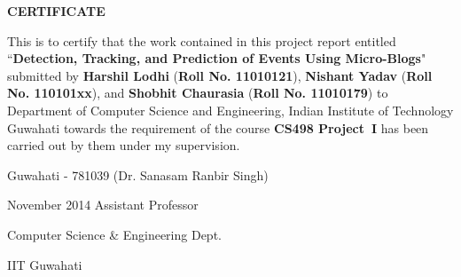 \documentclass[12pt,a4paper]{report}
\begin{document}

 \setcounter{page}{2}
\begin{center}
{\Large{\bf{CERTIFICATE}}}
\end{center}

\noindent
This is to certify that the work contained in this project report
entitled ``{\bf Detection, Tracking, and Prediction of Events Using Micro-Blogs}" submitted
by {\bf Harshil Lodhi} (\small{{\bf Roll No. 11010121})}, {\bf Nishant Yadav} (\small{{\bf Roll No. 110101xx})}, 
and {\bf Shobhit Chaurasia} (\small{{\bf Roll No. 11010179})} to Department of Computer Science and Engineering, 
Indian Institute of Technology Guwahati
towards the requirement of the course \textbf{CS498 Project~I}
has been carried out by them under my
supervision.

\vspace{4cm}

\noindent Guwahati - 781039 \hfill (Dr. Sanasam Ranbir Singh)

\noindent November 2014 \hfill \small{Assistant Professor}

\hfill \small{Computer Science \& Engineering Dept.}

\hfill \small{IIT Guwahati}

\clearpage
\end{document}
